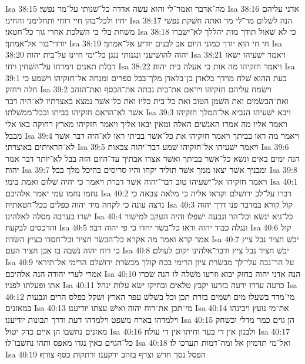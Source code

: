Isa 38:15  מה־אדבר ואמר־לי והוא עשׂה אדדה כל־שׁנותי על־מר נפשׁי׃
Isa 38:16  אדני עליהם יחיו ולכל־בהן חיי רוחי ותחלימני והחיני׃
Isa 38:17  הנה לשׁלום מר־לי מר ואתה חשׁקת נפשׁי משׁחת בלי כי השׁלכת אחרי גוך כל־חטאי׃
Isa 38:18  כי לא שׁאול תודך מות יהללך לא־ישׂברו יורדי־בור אל־אמתך׃
Isa 38:19  חי חי הוא יודך כמוני היום אב לבנים יודיע אל־אמתך׃
Isa 38:20  יהוה להושׁיעני ונגנותי ננגן כל־ימי חיינו על־בית יהוה׃
Isa 38:21  ויאמר ישׁעיהו ישׂאו דבלת תאנים וימרחו על־השׁחין ויחי׃
Isa 38:22  ויאמר חזקיהו מה אות כי אעלה בית יהוה׃
Isa 39:1  בעת ההוא שׁלח מרדך בלאדן בן־בלאדן מלך־בבל ספרים ומנחה אל־חזקיהו וישׁמע כי חלה ויחזק׃
Isa 39:2  וישׂמח עליהם חזקיהו ויראם את־בית נכתה את־הכסף ואת־הזהב ואת־הבשׂמים ואת השׁמן הטוב ואת כל־בית כליו ואת כל־אשׁר נמצא באצרתיו לא־היה דבר אשׁר לא־הראם חזקיהו בביתו ובכל־ממשׁלתו׃
Isa 39:3  ויבא ישׁעיהו הנביא אל־המלך חזקיהו ויאמר אליו מה אמרו האנשׁים האלה ומאין יבאו אליך ויאמר חזקיהו מארץ רחוקה באו אלי מבבל׃
Isa 39:4  ויאמר מה ראו בביתך ויאמר חזקיהו את כל־אשׁר בביתי ראו לא־היה דבר אשׁר לא־הראיתים באוצרתי׃
Isa 39:5  ויאמר ישׁעיהו אל־חזקיהו שׁמע דבר־יהוה צבאות׃
Isa 39:6  הנה ימים באים ונשׂא כל־אשׁר בביתך ואשׁר אצרו אבתיך עד־היום הזה בבל לא־יותר דבר אמר יהוה׃
Isa 39:7  ומבניך אשׁר יצאו ממך אשׁר תוליד יקחו והיו סריסים בהיכל מלך בבל׃
Isa 39:8  ויאמר חזקיהו אל־ישׁעיהו טוב דבר־יהוה אשׁר דברת ויאמר כי יהיה שׁלום ואמת בימי׃
Isa 40:1  נחמו נחמו עמי יאמר אלהיכם׃
Isa 40:2  דברו על־לב ירושׁלם וקראו אליה כי מלאה צבאה כי נרצה עונה כי לקחה מיד יהוה כפלים בכל־חטאתיה׃
Isa 40:3  קול קורא במדבר פנו דרך יהוה ישׁרו בערבה מסלה לאלהינו׃
Isa 40:4  כל־גיא ינשׂא וכל־הר וגבעה ישׁפלו והיה העקב למישׁור והרכסים לבקעה׃
Isa 40:5  ונגלה כבוד יהוה וראו כל־בשׂר יחדו כי פי יהוה דבר׃
Isa 40:6  קול אמר קרא ואמר מה אקרא כל־הבשׂר חציר וכל־חסדו כציץ השׂדה׃
Isa 40:7  יבשׁ חציר נבל ציץ כי רוח יהוה נשׁבה בו אכן חציר העם׃
Isa 40:8  יבשׁ חציר נבל ציץ ודבר־אלהינו יקום לעולם׃
Isa 40:9  על הר־גבה עלי־לך מבשׂרת ציון הרימי בכח קולך מבשׂרת ירושׁלם הרימי אל־תיראי אמרי לערי יהודה הנה אלהיכם׃
Isa 40:10  הנה אדני יהוה בחזק יבוא וזרעו משׁלה לו הנה שׂכרו אתו ופעלתו לפניו׃
Isa 40:11  כרעה עדרו ירעה בזרעו יקבץ טלאים ובחיקו ישׂא עלות ינהל׃
Isa 40:12  מי־מדד בשׁעלו מים ושׁמים בזרת תכן וכל בשׁלשׁ עפר הארץ ושׁקל בפלס הרים וגבעות במאזנים׃
Isa 40:13  מי־תכן את־רוח יהוה ואישׁ עצתו יודיענו׃
Isa 40:14  את־מי נועץ ויבינהו וילמדהו בארח משׁפט וילמדהו דעת ודרך תבונות יודיענו׃
Isa 40:15  הן גוים כמר מדלי וכשׁחק מאזנים נחשׁבו הן איים כדק יטול׃
Isa 40:16  ולבנון אין די בער וחיתו אין די עולה׃
Isa 40:17  כל־הגוים כאין נגדו מאפס ותהו נחשׁבו־לו׃
Isa 40:18  ואל־מי תדמיון אל ומה־דמות תערכו לו׃
Isa 40:19  הפסל נסך חרשׁ וצרף בזהב ירקענו ורתקות כסף צורף׃
